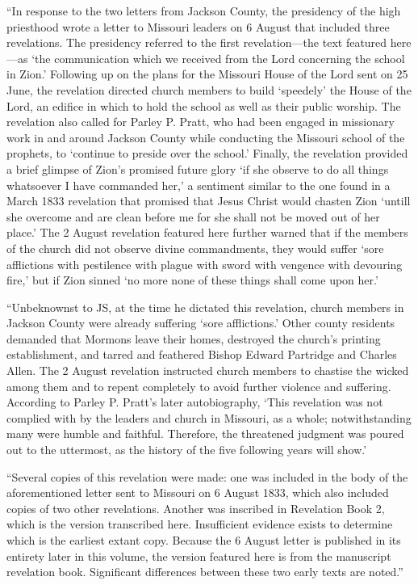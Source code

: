 			``In response to the two letters from Jackson County, the presidency of the high priesthood wrote a letter to Missouri leaders on 6 August that included three revelations. The presidency referred to the first revelation---the text featured here---as `the communication which we received from the Lord concerning the school in Zion.' Following up on the plans for the Missouri House of the Lord sent on 25 June, the revelation directed church members to build `speedely' the House of the Lord, an edifice in which to hold the school as well as their public worship. The revelation also called for Parley P. Pratt, who had been engaged in missionary work in and around Jackson County while conducting the Missouri school of the prophets, to `continue to preside over the school.' Finally, the revelation provided a brief glimpse of Zion's promised future glory `if she observe to do all things whatsoever I have commanded her,' a sentiment similar to the one found in a March 1833 revelation that promised that Jesus Christ would chasten Zion `untill she overcome and are clean before me for she shall not be moved out of her place.' The 2 August revelation featured here further warned that if the members of the church did not observe divine commandments, they would suffer `sore afflictions with pestilence with plague with sword with vengence with devouring fire,' but if Zion sinned `no more none of these things shall come upon her.'
			
			``Unbeknownst to JS, at the time he dictated this revelation, church members in Jackson County were already suffering `sore afflictions.' Other county residents demanded that Mormons leave their homes, destroyed the church's printing establishment, and tarred and feathered Bishop Edward Partridge and Charles Allen. The 2 August revelation instructed church members to chastise the wicked among them and to repent completely to avoid further violence and suffering. According to Parley P. Pratt's later autobiography, `This revelation was not complied with by the leaders and church in Missouri, as a whole; notwithstanding many were humble and faithful. Therefore, the threatened judgment was poured out to the uttermost, as the history of the five following years will show.'
			
			``Several copies of this revelation were made: one was included in the body of the aforementioned letter sent to Missouri on 6 August 1833, which also included copies of two other revelations. Another was inscribed in Revelation Book 2, which is the version transcribed here. Insufficient evidence exists to determine which is the earliest extant copy. Because the 6 August letter is published in its entirety later in this volume, the version featured here is from the manuscript revelation book. Significant differences between these two early texts are noted.''
			
